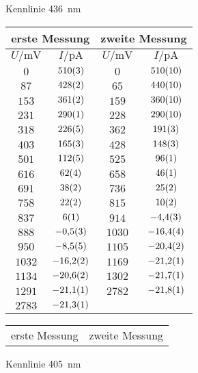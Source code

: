 \begin{figure}[htbp]
   \centering
\parbox{0.475\linewidth}{\centering
\caption{Kennlinie \SI{436}{nm}}
\begin{tabular}{cc||cc}
\hline\multicolumn{2}{c||}{erste Messung} & \multicolumn{2}{c}{zweite Messung}\\

\hline
$U / \unit{\milli\volt}$ & $I / \unit{\pico\ampere}$ & $U / \unit{\milli\volt}$ & $I / \unit{\pico\ampere}$ \\ 
\hline
$\num{0}$ & $\num{510\pm 3}$ & $\num{0}$ & $\num{510\pm 10}$ \\
$\num{87}$ & $\num{428\pm 2}$ & $\num{65}$ & $\num{440\pm 10}$ \\
$\num{153}$ & $\num{361\pm 2}$ & $\num{159}$ & $\num{360\pm 10}$ \\
$\num{231}$ & $\num{290\pm 1}$ & $\num{228}$ & $\num{290\pm 10}$ \\
$\num{318}$ & $\num{226\pm 5}$ & $\num{362}$ & $\num{191\pm 3}$ \\
$\num{403}$ & $\num{165\pm 3}$ & $\num{428}$ & $\num{148\pm 3}$ \\
$\num{501}$ & $\num{112\pm 5}$ & $\num{525}$ & $\num{96\pm 1}$ \\
$\num{616}$ & $\num{62\pm 4}$ & $\num{658}$ & $\num{46\pm 1}$ \\
$\num{691}$ & $\num{38\pm 2}$ & $\num{736}$ & $\num{25\pm 2}$ \\
$\num{758}$ & $\num{22\pm 2}$ & $\num{815}$ & $\num{10\pm 2}$ \\
$\num{837}$ & $\num{6\pm 1}$ & $\num{914}$ & $\num{-4.4\pm 0.3}$ \\
$\num{888}$ & $\num{-0.5\pm 0.3}$ & $\num{1030}$ & $\num{-16.4\pm 0.4}$ \\
$\num{950}$ & $\num{-8.5\pm 0.5}$ & $\num{1105}$ & $\num{-20.4\pm 0.2}$ \\
$\num{1032}$ & $\num{-16.2\pm 0.2}$ & $\num{1169}$ & $\num{-21.2\pm 0.1}$ \\
$\num{1134}$ & $\num{-20.6\pm 0.2}$ & $\num{1302}$ & $\num{-21.7\pm 0.1}$ \\
$\num{1291}$ & $\num{-21.1\pm 0.1}$ & $\num{2782}$ & $\num{-21.8\pm 0.1}$ \\
$\num{2783}$ & $\num{-21.3\pm 0.1}$ &    &    \\
\hline\end{tabular}
\label{kennlinie_436nm}
}\quad\parbox{0.475\linewidth}{\centering
\caption{Kennlinie \SI{405}{nm}}
\begin{tabular}{cc||cc}
\hline\multicolumn{2}{c||}{erste Messung} & \multicolumn{2}{c}{zweite Messung}\\


\end{tabular}}
\end{figure}
